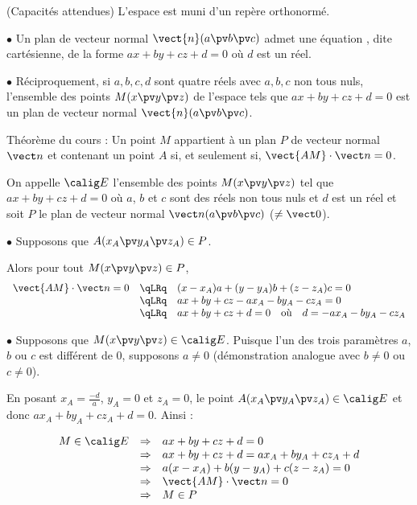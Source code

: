 \documentclass[12pt, french]{book}
\begin{document}

\begin{Thm}{(Capacités attendues)}
	L'espace est muni d'un repère orthonormé.
	
	$\bullet$ Un plan de vecteur normal $\vect{n}(a\pv b\pv c)$ admet une équation , dite cartésienne, de la forme $ax + by +cz + d = 0$ où $d$ est un réel.
	
	$\bullet$ Réciproquement, si $a, b, c, d$ sont quatre réels avec $a, b, c$ non tous nuls, l'ensemble des points $M(x \pv y \pv z)$ de l'espace tels que $ax + by +cz + d = 0$ est un plan de vecteur normal $\vect{n}(a \pv b \pv c)$.
\end{Thm}


\begin{Demo}
	Théorème du cours : Un point $M$ appartient à un plan $P$ de vecteur normal $\vect n$ et contenant un point $A$ si, et seulement si, $\vect{AM} \cdot \vect n = 0$.\medskip
	
	On appelle $\calig E$ l'ensemble des points $M(x \pv y \pv z)$ tel que $ax + by + cz + d = 0$ où $a$, $b$ et $c$ sont des réels non tous nuls et $d$ est un réel et soit $P$ le plan de vecteur normal $\vect n(a \pv b \pv c)$ ($\neq \vect 0$).\medskip
	
	$\bullet$  Supposons que $A(x_A \pv y_A \pv z_A) \in P$.
	
	Alors pour tout $M(x \pv y \pv z) \in P$,
	\[\begin{array}{rcl}
	\vect{AM} \cdot \vect n = 0 & \qLRq & (x - x_A)a + (y - y_A)b + (z - z_A)c = 0 \\
	& \qLRq & ax + by + cz - ax_A - by_A  - cz_A = 0 \\
	& \qLRq & ax + by + cz + d = 0 \quad \text{où} \quad d = - ax_A - by_A  - cz_A
	\end{array}\]
	
	
	$\bullet$ Supposons que $M(x \pv y \pv z) \in \calig E$. Puisque l'un des trois paramètres $a$, $b$ ou $c$ est différent de $0$, supposons $a \neq 0$ (démonstration analogue avec $b \neq 0$ ou $c \neq 0$).
	
	En posant $x_A = \frac{-d}{a}$, $y_A = 0$ et $z_A = 0$, le point $A(x_A \pv y_A \pv z_A) \in \calig E$ et donc $ax_A + by_A + cz_A + d = 0$. Ainsi :
	
	\[\begin{array}{r@{\quad\Rightarrow\quad}l}
	M \in \calig E & ax + by + cz + d = 0 \\
	& ax + by + cz + d = ax_A + by_A + cz_A + d \\
	& a(x-x_A) + b(y - y_A) + c(z - z_A) = 0 \\
	& \vect{AM} \cdot \vect n = 0 \\
	& M \in P
	\end{array}\]
	
	
\end{Demo}
\end{document}
